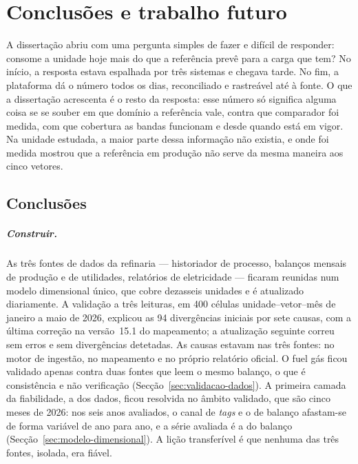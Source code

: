 
\chapter{Conclusões e trabalho futuro}
\label{cha:conclusoes}

A dissertação abriu com uma pergunta simples de fazer e difícil de
responder: consome a unidade hoje mais do que a referência prevê para a carga
que tem? No início, a resposta estava espalhada por três sistemas e chegava
tarde. No fim, a plataforma dá o número todos os dias, reconciliado e
rastreável até à fonte. O que a dissertação acrescenta é o resto da resposta:
esse número só significa alguma coisa se se souber em que domínio a
referência vale, contra que comparador foi medida, com que cobertura as
bandas funcionam e desde quando está em vigor. Na unidade estudada, a maior
parte dessa informação não existia, e onde foi medida mostrou que a
referência em produção não serve da mesma maneira aos cinco vetores.

\section{Conclusões}
\label{sec:conclusoes}

\paragraph{Construir.} As três fontes de dados da refinaria --- historiador
de processo, balanços mensais de produção e de utilidades, relatórios de
eletricidade --- ficaram reunidas num modelo dimensional único, que cobre
dezasseis unidades e é atualizado diariamente. A validação a três leituras,
em 400 células unidade--vetor--mês de janeiro a maio de 2026, explicou as 94
divergências iniciais por sete causas, com a última correção na versão~15.1
do mapeamento; a atualização seguinte correu sem erros e sem divergências
detetadas. As causas estavam nas três fontes: no
motor de ingestão, no mapeamento e no próprio relatório oficial. O fuel gás
ficou validado apenas contra duas fontes que leem o mesmo balanço, o que é
consistência e não verificação (Secção~\ref{sec:validacao-dados}). A
primeira camada da fiabilidade, a dos dados, ficou resolvida no âmbito
validado, que são cinco meses de 2026: nos seis anos avaliados, o canal de
\emph{tags} e o de balanço afastam-se de forma variável de ano para ano, e a
série avaliada é a do balanço (Secção~\ref{sec:modelo-dimensional}). A lição
transferível é que nenhuma das três fontes, isolada, era fiável.

